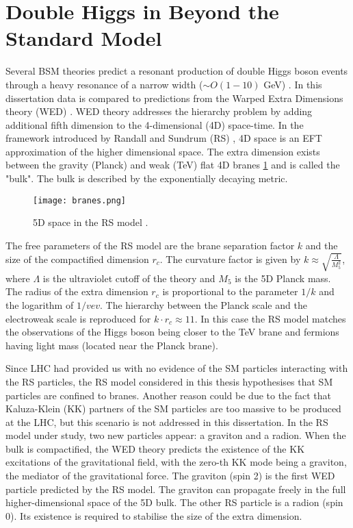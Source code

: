 \section{Double Higgs in Beyond the Standard Model}

Several BSM theories \cite{Huang:2017nnw, Dolan:2012ac, Kanemura:2016tan} predict a resonant production of double Higgs boson events through a heavy resonance of a narrow width ($\sim O(1-10)$ GeV) \cite{Sirunyan:2018iwt}. In this dissertation data is compared to predictions from the Warped Extra Dimensions theory (WED) \cite{Oliveira:2014kla}. WED theory addresses the hierarchy problem by adding additional fifth dimension to the 4-dimensional (4D) space-time. In the framework introduced by Randall and Sundrum (RS) \cite{Randall:1999ee}, 4D space is an EFT approximation of the higher dimensional space. The extra dimension exists between the gravity (Planck) and weak (TeV) flat 4D branes \ref{branes} and is called the "bulk". The bulk is described by the exponentially decaying metric. 



\begin{figure}[H]
\centering
\texttt{[image: branes.png]}
\caption[RS branes]{5D space in the RS model \cite{Xanda}.}
\label{branes}
\end{figure}




The free parameters of the RS model are the brane separation factor $k$ and the size of the compactified dimension $r_c$. The curvature factor is given by $k \approx \sqrt{ \frac{\Lambda}{M^2_5}  }$, where $\Lambda$ is the ultraviolet cutoff of the theory and $M_5$ is the 5D Planck mass. The radius of the extra dimension $r_c$ is proportional to the parameter $1/k$ and the logarithm of $1/vev$. The hierarchy between the Planck scale and the electroweak scale is reproduced for $k \cdot r_c \approx 11$. In this case the RS model matches the observations of the Higgs boson being closer to the TeV brane and fermions having light mass (located near the Planck brane).


Since LHC had provided us with no evidence of the SM particles interacting with the RS particles, the RS model considered in this thesis hypothesises that SM particles are confined to branes. Another reason could be due to the fact that Kaluza-Klein (KK) \cite{Uzawa:1999pg} partners of the SM particles are too massive to be produced at the LHC, but this scenario is not addressed in this dissertation. In the RS model under study, two new particles appear: a graviton and a radion. When the bulk is compactified, the WED theory predicts the existence of the KK excitations of the gravitational field, with the zero-th KK mode being a graviton, the mediator of the gravitational force. The graviton (spin 2) is the first WED particle predicted by the RS model. The graviton can propagate freely in the full higher-dimensional space of the 5D bulk. The other RS particle is a radion (spin 0). Its existence is required to stabilise the size of the extra dimension. 


